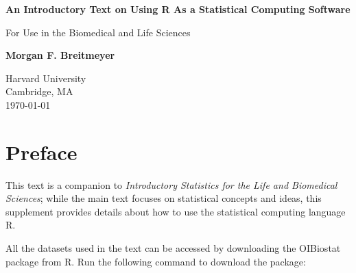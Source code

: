 \documentclass{report}\usepackage[]{graphicx}\usepackage[]{color}
\begin{document}
\minitoc

\begin{titlepage}
    \begin{center}
        \vspace*{1cm}
        
        \textbf{An Introductory Text on Using R As a Statistical Computing Software}
        
        \vspace{0.5cm}
        For Use in the Biomedical and Life Sciences 
        
        \vspace{1.5cm}
        
        \textbf{Morgan F. Breitmeyer}
        
        \vfill
        
        
        \vspace{0.8cm}
        
        
        Harvard University\\
        Cambridge, MA\\
        \today
        
    \end{center}
\end{titlepage}


\setcounter{tocdepth}{1}
\dominitoc
\tableofcontents

\newpage 
\setcounter{chapter}{-1}
\chapter{Preface}
\minitoc

This text is a companion to \textit{Introductory Statistics for the Life and Biomedical Sciences}; while the main text focuses on statistical concepts and ideas, this supplement provides details about how to use the statistical computing language \textsf{R}.

All the datasets used in the text can be accessed by downloading the OIBiostat package from \textsf{R}. Run the following command to download the package:
\end{document}
